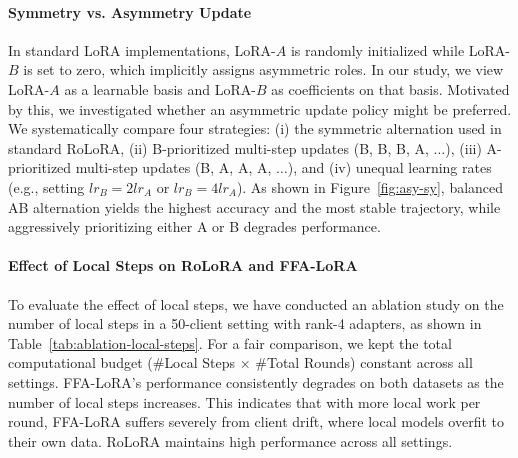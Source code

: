 \documentclass{article}
\theoremstyle{plain}
\theoremstyle{definition}
\theoremstyle{remark}
\begin{document}
\paragraph{Symmetry vs. Asymmetry Update}
In standard LoRA implementations, LoRA-$A$ is randomly initialized while LoRA-$B$ is set to zero, which implicitly assigns asymmetric roles. In our study, we view LoRA-$A$ as a learnable basis and LoRA-$B$ as coefficients on that basis. Motivated by this, we investigated whether an asymmetric update policy might be preferred. We systematically compare four strategies: (i) the symmetric alternation used in standard RoLoRA, (ii) B-prioritized multi-step updates (B, B, B, A, $\dots$), (iii) A-prioritized multi-step updates (B, A, A, A, $\dots$), and (iv) unequal learning rates (e.g., setting $lr_{B}=2lr_{A}$ or $lr_{B}=4lr_{A}$). As shown in Figure~\ref{fig:asy-sy}, balanced AB alternation yields the highest accuracy and the most stable trajectory, while aggressively prioritizing either A or B degrades performance.

\paragraph{Effect of Local Steps on RoLoRA and FFA-LoRA} To evaluate the effect of local steps, we have conducted an ablation study on the number of local steps in a 50-client setting with rank-4 adapters, as shown in Table~\ref{tab:ablation-local-steps}. For a fair comparison, we kept the total computational budget ($\#$Local Steps $\times$ $\#$Total Rounds) constant across all settings. FFA-LoRA's performance consistently degrades on both datasets as the number of local steps increases. This indicates that with more local work per round, FFA-LoRA suffers severely from client drift, where local models overfit to their own data. RoLoRA maintains high performance across all settings. 
\end{document}
